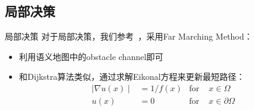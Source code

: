 \subsection{局部决策}
\begin{frame}{局部决策}
    对于局部决策，我们参考~\cite*{chaplot2020object}，采用Far Marching Method：
    \begin{itemize}
        \item 利用语义地图中的obstacle channel即可
        \item 和Dijkstra算法类似，通过求解Eikonal方程来更新最短路径：
        $$
        \begin{aligned}
            \mid\nabla u(x)\mid&=1/f(x)&\text{for }&x\in\Omega\\
            u(x)&=0&\text{for }&x\in\partial\Omega
        \end{aligned}
        $$
    \end{itemize}
\end{frame}

